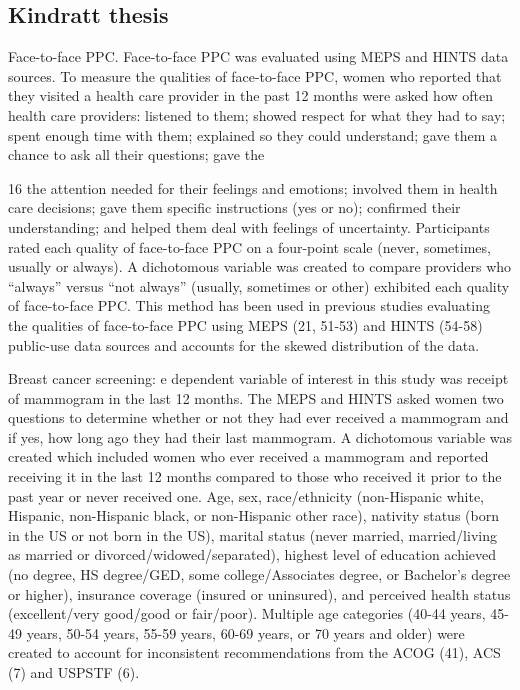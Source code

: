 \documentclass[../main.tex]{subfiles}
\begin{document}
\subsection{Kindratt thesis}


Face-to-face PPC. Face-to-face PPC was evaluated using MEPS and HINTS data sources. To measure the qualities of face-to-face PPC, women who reported that they visited a health care provider in the past 12 months were asked how often health care providers: listened to them; showed respect for what they had to say; spent enough time with them; explained so they could understand; gave them a chance to ask all their questions; gave the

16 the attention needed for their feelings and emotions; involved them in health care decisions; gave them specific instructions (yes or no); confirmed their understanding; and helped them deal with feelings of uncertainty. Participants rated each quality of face-to-face PPC on a four-point scale (never, sometimes, usually or always). A dichotomous variable was created to compare providers who “always” versus “not always” (usually, sometimes or other) exhibited each quality of face-to-face PPC. This method has been used in previous studies evaluating the qualities of face-to-face PPC using MEPS (21, 51-53) and HINTS (54-58) public-use data sources and accounts for the skewed distribution of the data.

Breast cancer screening:
e dependent variable of interest in this study was receipt of mammogram in the last 12 months. The MEPS and HINTS asked women two questions to determine whether or not they had ever received a mammogram and if yes, how long ago they had their last mammogram. A dichotomous variable was created which included women who ever received a mammogram and reported receiving it in the last 12 months compared to those who received it prior to the past year or never received one.
Age, sex, race/ethnicity (non-Hispanic white, Hispanic, non-Hispanic black, or non-Hispanic other race), nativity status (born in the US or not born in the US), marital status (never married, married/living as married or divorced/widowed/separated), highest level of education achieved (no degree, HS degree/GED, some college/Associates degree, or Bachelor’s degree or higher), insurance coverage (insured or uninsured), and perceived health status (excellent/very good/good or fair/poor). Multiple age categories (40-44 years, 45-49 years, 50-54 years, 55-59 years, 60-69 years, or 70 years and older) were created to account for inconsistent recommendations from the ACOG (41), ACS (7) and USPSTF (6).
\end{document}
